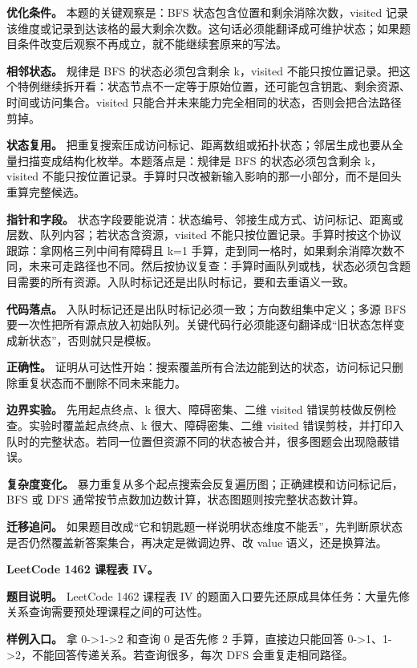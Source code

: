 \textbf{优化条件。} 本题的关键观察是：BFS 状态包含位置和剩余消除次数，visited 记录该维度或记录到达该格的最大剩余次数。这句话必须能翻译成可维护状态；如果题目条件改变后观察不再成立，就不能继续套原来的写法。

\textbf{相邻状态。} 规律是 BFS 的状态必须包含剩余 k，visited 不能只按位置记录。把这个特例继续拆开看：状态节点不一定等于原始位置，还可能包含钥匙、剩余资源、时间或访问集合。visited 只能合并未来能力完全相同的状态，否则会把合法路径剪掉。

\textbf{状态复用。} 把重复搜索压成访问标记、距离数组或拓扑状态；邻居生成也要从全量扫描变成结构化枚举。本题落点是：规律是 BFS 的状态必须包含剩余 k，visited 不能只按位置记录。手算时只改被新输入影响的那一小部分，而不是回头重算完整候选。

\textbf{指针和字段。} 状态字段要能说清：状态编号、邻接生成方式、访问标记、距离或层数、队列内容；若状态含资源，visited 不能只按位置记录。手算时按这个协议跟踪：拿网格三列中间有障碍且 k=1 手算，走到同一格时，如果剩余消障次数不同，未来可走路径也不同。然后按协议复查：手算时画队列或栈，状态必须包含题目需要的所有资源。入队时标记还是出队时标记，要和去重语义一致。

\textbf{代码落点。} 入队时标记还是出队时标记必须一致；方向数组集中定义；多源 BFS 要一次性把所有源点放入初始队列。关键代码行必须能逐句翻译成“旧状态怎样变成新状态”，否则就只是模板。

\textbf{正确性。} 证明从可达性开始：搜索覆盖所有合法边能到达的状态，访问标记只删除重复状态而不删除不同未来能力。

\textbf{边界实验。} 先用起点终点、k 很大、障碍密集、二维 visited 错误剪枝做反例检查。实验时覆盖起点终点、k 很大、障碍密集、二维 visited 错误剪枝，并打印入队时的完整状态。若同一位置但资源不同的状态被合并，很多图题会出现隐蔽错误。

\textbf{复杂度变化。} 暴力重复从多个起点搜索会反复遍历图；正确建模和访问标记后，BFS 或 DFS 通常按节点数加边数计算，状态图题则按完整状态数计算。

\textbf{迁移追问。} 如果题目改成“它和钥匙题一样说明状态维度不能丢”，先判断原状态是否仍然覆盖新答案集合，再决定是微调边界、改 value 语义，还是换算法。

\noindent\textbf{LeetCode 1462 课程表 IV。}

\textbf{题目说明。} LeetCode 1462 课程表 IV 的题面入口要先还原成具体任务：大量先修关系查询需要预处理课程之间的可达性。

\textbf{样例入口。} 拿 0->1->2 和查询 0 是否先修 2 手算，直接边只能回答 0->1、1->2，不能回答传递关系。若查询很多，每次 DFS 会重复走相同路径。

